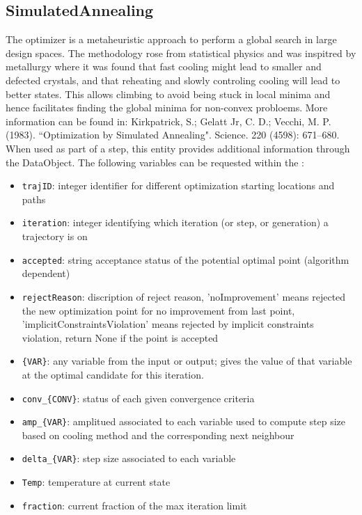 \subsection{SimulatedAnnealing}
  The  optimizer is a metaheuristic approach
  to perform a global search in large design spaces. The methodology rose
  from statistical physics and was inspitred by metallurgy where                             it was
  found that fast cooling might lead to smaller and defected crystals,
  and that reheating and slowly controling cooling will lead to better states.
  This allows climbing to avoid being stuck in local minima and hence facilitates
  finding the global minima for non-convex probloems.                             More information
  can be found in: Kirkpatrick, S.; Gelatt Jr, C. D.; Vecchi, M. P. (1983).
  ``Optimization by Simulated Annealing". Science. 220 (4598): 671–680.
\vspace{7pt} \\When used as part of a  step, this entity provides
        additional information through the  DataObject. The
        following variables can be requested within the :
        \begin{itemize}
          \item \texttt{trajID}: integer identifier for different optimization starting locations and paths
             \item \texttt{iteration}: integer identifying which iteration (or step, or generation) a trajectory is on
             \item \texttt{accepted}: string acceptance status of the potential optimal point (algorithm dependent)
             \item \texttt{rejectReason}: discription of reject reason, 'noImprovement' means rejected the new optimization point for no improvement from last point, 'implicitConstraintsViolation' means rejected by implicit constraints violation, return None if the point is accepted
             \item \texttt{\{VAR\}}: any variable from the  input or output; gives the value of that variable at the optimal candidate for this iteration.
             \item \texttt{conv\_\{CONV\}}: status of each given convergence criteria
             \item \texttt{amp\_\{VAR\}}: amplitued associated to each variable used to compute step size based on cooling method and the corresponding next neighbour
             \item \texttt{delta\_\{VAR\}}: step size associated to each variable
             \item \texttt{Temp}: temperature at current state
             \item \texttt{fraction}: current fraction of the max iteration limit
           
         \end{itemize}

